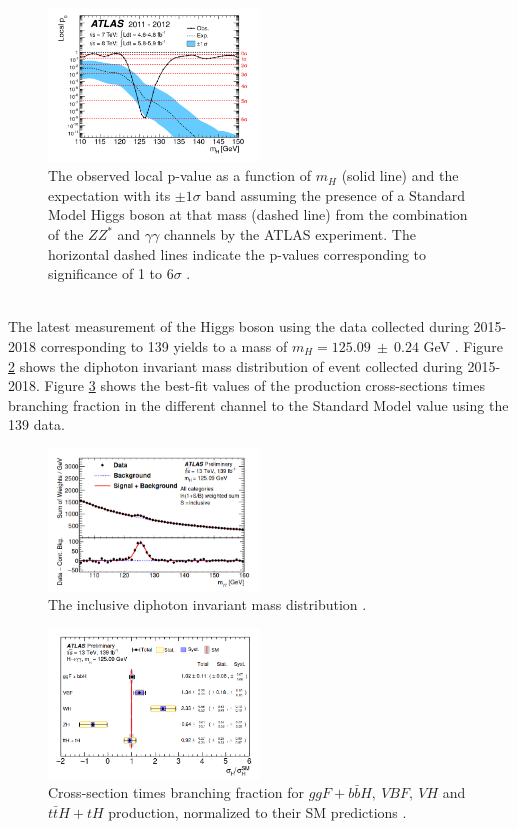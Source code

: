 \begin{figure}[htbp]
    \centering
    \includegraphics[width=0.5\textwidth]{Ch1/Img/Hp0.png}
    \caption{The observed local p-value as a function of $m_H$ (solid line) and the expectation with its $\pm1\sigma$ band assuming the presence of a Standard Model Higgs boson at that mass (dashed line) from the combination of the $ZZ^*$ and  $\gamma\gamma$ channels by the ATLAS experiment. The horizontal dashed lines indicate the p-values corresponding to significance of 1 to 6$\sigma$ \cite{ATLAS_2012}.}
    \label{fig:chap1:H2012:P0}
\end{figure}
\\
The latest measurement of the Higgs boson using the data collected during 2015-2018 corresponding to 139 \ifb yields to a mass of $m_{H}=125.09 \ \pm \ 0.24 $ GeV \cite{Mass}. Figure \ref{fig:chap1:H2012:MyyRun2} shows the diphoton invariant mass distribution of event collected during 2015-2018. Figure \ref{fig:chap1:H2012:HXsecRun2} shows the best-fit values of the production cross-sections times branching fraction in the different channel to the Standard Model value using the 139 \ifb data.
\begin{figure}[htbp]
    \centering
    \includegraphics[width=0.5\textwidth]{Ch1/Img/myy_run2.png}
    \caption{The inclusive diphoton invariant mass distribution \cite{ATLAS_2020}.}
    \label{fig:chap1:H2012:MyyRun2}
\end{figure}
\begin{figure}[htbp]
    \centering
    \includegraphics[width=0.5\textwidth]{Ch1/Img/HXsecRun2.png}
    \caption{Cross-section times branching fraction for $ggF+b\bar{b}H , \ VBF, \ VH$ and $t\bar{t}H + tH$ production, normalized to their SM predictions \cite{ATLAS_2020}.}
    \label{fig:chap1:H2012:HXsecRun2}
\end{figure}
